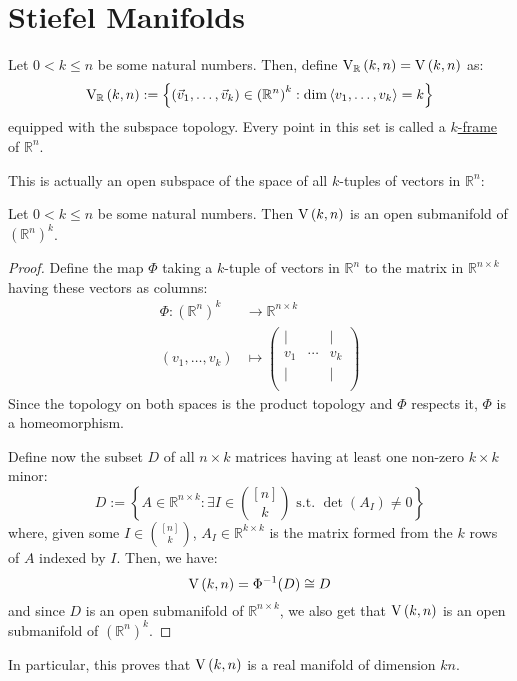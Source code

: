\section{Stiefel Manifolds}
\begin{definition} Let $0<k\leq n$ be some natural numbers. Then, define $\St{k}{n}{\mathbb{R}}=\St{k}{n}$ as:
\[\St{k}{n}{\mathbb{R}}:=\left\{\left(\vec{v}_1,\ldots,\vec{v}_k\right)\in{\left(\mathbb{R}^n\right)}^k:\dim\left<v_1,\ldots,v_k\right>=k\right\}\]
equipped with the subspace topology. Every point in this set is called a \ul{$k$-frame} of $\mathbb{R}^n$.
\end{definition}
This is actually an open subspace of the space of all $k$-tuples of vectors in $\mathbb{R}^n$:
\begin{proposition}\label{prop:St_open} Let $0<k\leq n$ be some natural numbers. Then $\St{k}{n}$ is an open submanifold of ${\left(\mathbb{R}^n\right)}^k$.
\end{proposition}
\begin{proof} Define the map $\Phi$ taking a $k$-tuple of vectors in $\mathbb{R}^n$ to the matrix in $\mathbb{R}^{n\times k}$ having these vectors as columns:
\begin{align*}
\Phi:{\left(\mathbb{R}^n\right)}^k&\to \mathbb{R}^{n\times k}\\[1em]
(v_1,\ldots,v_k)&\mapsto \left(\begin{array}{ccc}
|&&|\\[-.3em]
v_1&\cdots&v_k\\[-.3em]
|&&|\\
\end{array}\right)
\end{align*}
Since the topology on both spaces is the product topology and $\Phi$ respects it, $\Phi$ is a homeomorphism.

Define now the subset $D$ of all $n\times k$ matrices having at least one non-zero $k\times k$ minor:
\[D:=\left\{A\in\mathbb{R}^{n\times k}:\exists I\in\binom{[n]}{k}\text{ s.t. }\det(A_I)\neq0\right\}\]
where, given some $I\in\binom{[n]}{k}$, $A_I\in\mathbb{R}^{k\times k}$ is the matrix formed from the $k$ rows of $A$ indexed by $I$. Then, we have:
\[\St{k}{n}=\Phi^{-1}(D)\cong D\]
and since $D$ is an open submanifold of $\mathbb{R}^{n\times k}$, we also get that $\St{k}{n}$ is an open submanifold of ${\left(\mathbb{R}^n\right)}^k$.
\end{proof}
\begin{remark} In particular, this proves that $\St{k}{n}$ is a real manifold of dimension $kn$.
\end{remark}

